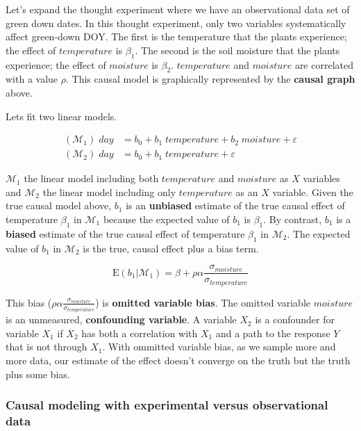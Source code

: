 \documentclass[]{book}
\begin{document}
Let's expand the thought experiment where we have an observational data set of green down dates. In this thought experiment, only two variables systematically affect green-down DOY. The first is the temperature that the plants experience; the effect of \(temperature\) is \(\beta_1\). The second is the soil moisture that the plants experience; the effect of \(moisture\) is \(\beta_2\). \(temperature\) and \(moisture\) are correlated with a value \(\rho\). This causal model is graphically represented by the \textbf{causal graph} above.

Lets fit two linear models.

\begin{align}
(\mathcal{M}_1)\; day &= b_0 + b_1 \; temperature + b_2 \; moisture + \varepsilon\\
(\mathcal{M}_2)\; day &= b_0 + b_1 \; temperature + \varepsilon
\end{align}

\(\mathcal{M}_1\) the linear model including both \(temperature\) and \(moisture\) as \(X\) variables and \(\mathcal{M}_2\) the linear model including only \(temperature\) as an \(X\) variable. Given the true causal model above, \(b_1\) is an \textbf{unbiased} estimate of the true causal effect of temperature \(\beta_1\) in \(\mathcal{M}_1\) because the expected value of \(b_1\) is \(\beta_1\). By contrast, \(b_1\) is a \textbf{biased} estimate of the true causal effect of temperature \(\beta_1\) in \(\mathcal{M}_2\). The expected value of \(b_1\) in \(\mathcal{M}_2\) is the true, causal effect plus a bias term.

\begin{equation}
\mathrm{E}(b_1|\mathcal{M}_1) = \beta + \rho \alpha \frac{\sigma_{moisture}}{\sigma_{temperature}}
\end{equation}

This bias (\(\rho \alpha \frac{\sigma_{moisture}}{\sigma_{temperature}}\)) is \textbf{omitted variable bias}. The omitted variable \(moisture\) is an unmeasured, \textbf{confounding variable}. A variable \(X_2\) is a confounder for variable \(X_1\) if \(X_2\) has both a correlation with \(X_1\) and a path to the response \(Y\) that is not through \(X_1\). With ommitted variable bias, as we sample more and more data, our estimate of the effect doesn't converge on the truth but the truth plus some bias.

\hypertarget{causal-modeling-with-experimental-versus-observational-data}{%
\subsubsection{Causal modeling with experimental versus observational data}\label{causal-modeling-with-experimental-versus-observational-data}}
\end{document}
